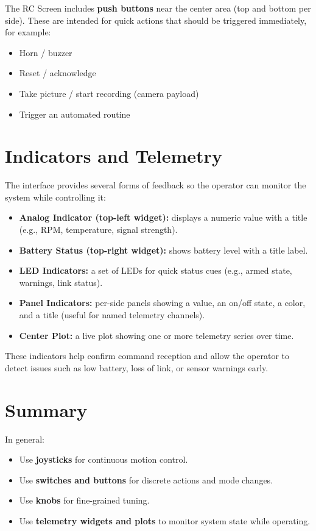 The RC Screen includes \textbf{push buttons} near the center area (top and bottom per side). These are intended for quick actions that should be triggered immediately, for example:

\begin{itemize}
    \item Horn / buzzer
    \item Reset / acknowledge
    \item Take picture / start recording (camera payload)
    \item Trigger an automated routine
\end{itemize}

\section{Indicators and Telemetry}
\label{sec:telemetry}

The interface provides several forms of feedback so the operator can monitor the system while controlling it:

\begin{itemize}
    \item \textbf{Analog Indicator (top-left widget):} displays a numeric value with a title (e.g., RPM, temperature, signal strength).
    \item \textbf{Battery Status (top-right widget):} shows battery level with a title label.
    \item \textbf{LED Indicators:} a set of LEDs for quick status cues (e.g., armed state, warnings, link status).
    \item \textbf{Panel Indicators:} per-side panels showing a value, an on/off state, a color, and a title (useful for named telemetry channels).
    \item \textbf{Center Plot:} a live plot showing one or more telemetry series over time.
\end{itemize}

These indicators help confirm command reception and allow the operator to detect issues such as low battery, loss of link, or sensor warnings early.

\section{Summary}
\label{sec:basic-controls-summary}

In general:
\begin{itemize}
    \item Use \textbf{joysticks} for continuous motion control.
    \item Use \textbf{switches and buttons} for discrete actions and mode changes.
    \item Use \textbf{knobs} for fine-grained tuning.
    \item Use \textbf{telemetry widgets and plots} to monitor system state while operating.
\end{itemize}